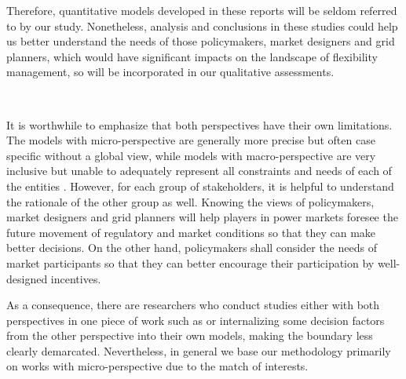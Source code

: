 Therefore, quantitative models developed in these reports will be seldom referred to by our study. Nonetheless, analysis and conclusions in these studies could help us better understand the needs of those policymakers, market designers and grid planners, which would have significant impacts on the landscape of flexibility management, so will be incorporated in our qualitative assessments. 

~\newline

It is worthwhile to emphasize that both perspectives have their own limitations. The models with micro-perspective are generally more precise but often case specific without a global view, while models with macro-perspective are very inclusive but unable to adequately represent all constraints and needs of each of the entities \cite{Zucker2013}. However, for each group of stakeholders, it is helpful to understand the rationale of the other group as well. Knowing the views of policymakers, market designers and grid planners will help players in power markets foresee the future movement of regulatory and market conditions so that they can make better decisions. On the other hand, policymakers shall consider the needs of market participants so that they can better encourage their participation by well-designed incentives.

As a consequence, there are researchers who conduct studies either with both perspectives in one piece of work such as \cite{Sioshansi2009,Denholm2009} or internalizing some decision factors from the other perspective into their own models, making the boundary less clearly demarcated. Nevertheless, in general we base our methodology primarily on works with micro-perspective due to the match of interests.







